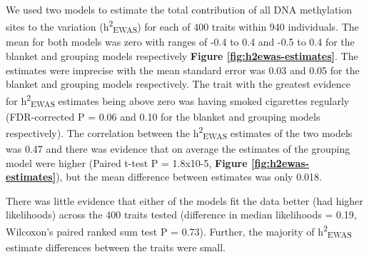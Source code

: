 \documentclass[11pt,oneside]{bristolthesis}
\begin{document}
We used two models to estimate the total contribution of all DNA methylation sites to the variation (h\textsuperscript{2}\textsubscript{EWAS}) for each of 400 traits within 940 individuals. The mean for both models was zero with ranges of -0.4 to 0.4 and -0.5 to 0.4 for the blanket and grouping models respectively \textbf{Figure \ref{fig:h2ewas-estimates}}. The estimates were imprecise with the mean standard error was 0.03 and 0.05 for the blanket and grouping models respectively. The trait with the greatest evidence for h\textsuperscript{2}\textsubscript{EWAS} estimates being above zero was having smoked cigarettes regularly (FDR-corrected P = 0.06 and 0.10 for the blanket and grouping models respectively). The correlation between the h\textsuperscript{2}\textsubscript{EWAS} estimates of the two models was 0.47 and there was evidence that on average the estimates of the grouping model were higher (Paired t-test P = 1.8x10-5, \textbf{Figure \ref{fig:h2ewas-estimates}}), but the mean difference between estimates was only 0.018.

There was little evidence that either of the models fit the data better (had higher likelihoods) across the 400 traits tested (difference in median likelihoods = 0.19, Wilcoxon's paired ranked sum test P = 0.73). Further, the majority of h\textsuperscript{2}\textsubscript{EWAS} estimate differences between the traits were small.
\end{document}
